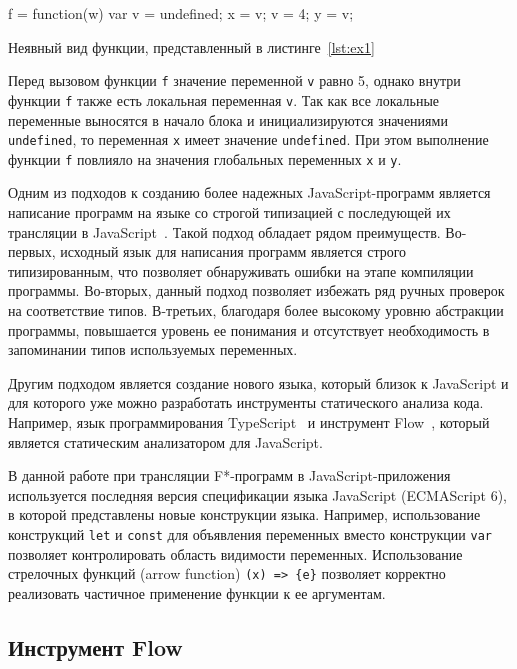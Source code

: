 \documentclass[12pt]{matmex-diploma}
\begin{document}
\begin{listing}
\begin{pyglist}[language=javascript,numbers=none,numbersep=5pt, fontsize=\small]
    f = function(w){
        var v = undefined;
        x = v; v = 4; y = v;
    }
\end{pyglist}
\caption{Неявный вид функции, представленный в листинге~\ref{lst:ex1}}
\label{lst:ex2} 
\end{listing}

Перед вызовом функции \verb|f| значение переменной \verb|v| равно 5, однако внутри функции \verb|f| также есть локальная переменная \verb|v|. Так как все локальные переменные выносятся в начало блока и инициализируются значениями \verb|undefined|, то переменная \verb|x| имеет значение \verb|undefined|. При этом выполнение функции \verb|f| повлияло на значения глобальных переменных \verb|x| и \verb|y|. 

Одним из подходов к созданию более надежных JavaScript-программ является написание программ на языке со строгой типизацией с последующей их трансляции в JavaScript~\cite{listjs}. Такой подход обладает рядом преимуществ. Во-первых, исходный язык для написания программ является строго типизированным, что позволяет обнаруживать ошибки на этапе компиляции программы. Во-вторых, данный подход позволяет избежать ряд ручных проверок на соответствие типов. В-третьих, благодаря более высокому уровню абстракции программы, повышается уровень ее понимания и отсутствует необходимость в запоминании типов используемых переменных. 

Другим подходом является создание нового языка, который близок к JavaScript и для которого уже можно разработать инструменты статического анализа кода. Например, язык программирования TypeScript~\cite{typeScript} и инструмент Flow~\cite{flow}, который является статическим анализатором для JavaScript.

В данной работе при трансляции F*-программ в JavaScript-приложения используется последняя версия спецификации языка JavaScript (ECMAScript 6), в которой представлены новые конструкции языка. Например, использование конструкций \verb|let| и \verb|const| для объявления переменных вместо конструкции \verb|var| позволяет контролировать область видимости переменных. Использование стрелочных функций (arrow function) \verb|(x) => {e}| позволяет корректно реализовать частичное применение функции к ее аргументам.

\subsection{Инструмент Flow}
\end{document}
